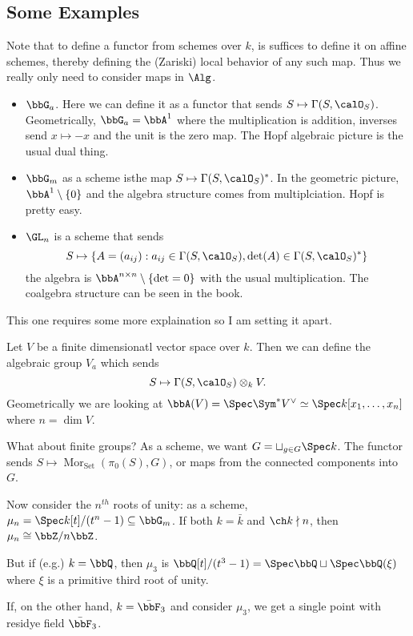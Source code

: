 \documentclass[12pt]{article}
\begin{document}
\subsection{Some Examples}
\begin{rmk}
	Note that to define a functor from schemes over $k$, is suffices to define it on affine schemes, thereby defining 
	the (Zariski) local behavior of any such map. Thus we really only need to consider maps in $\Alg$.
\end{rmk}
\begin{itemize}
	\item $\bbG_a$. Here we can define it as a functor that sends $S\mapsto\Gamma(S,\calO_S)$. Geometrically, $\bbG_a=\bbA^1$ where the multiplication is addition, inverses send $x\mapsto -x$ and the unit is the zero map.
	The Hopf algebraic picture is the usual dual thing.
	\item $\bbG_m$ as a scheme isthe map $S\mapsto \Gamma(S,\calO_S)^\ast$. In the geometric picture, $\bbA^1\setminus\{0\}$ and the algebra structure comes from multiplciation. Hopf is pretty easy.
	\item $\GL_n$ is a scheme that sends
	\[S\mapsto \left\{A=(a_{ij}): a_{ij}\in\Gamma(S,\calO_S), \det(A)\in\Gamma(S,\calO_S)^\ast\right\}\]
	the algebra is $\bbA^{n\times n}\setminus \{\det = 0\}$ with the usual multiplication. The coalgebra structure can be seen in the book.
\end{itemize}
This one requires some more explaination so I am setting it apart.
\begin{ex}
	Let $V$ be a finite dimensionatl vector space over $k$. Then we can define the algebraic group $V_a$ which sends 
	\[S\mapsto \Gamma(S,\calO_S)\otimes_k V.\]
	Geometrically we are looking at $\bbA(V)=\Spec\Sym ^\ast V^\vee\simeq \Spec k[x_1,\dots,x_n]$ where $n=\dim V$.
\end{ex}

What about finite groups? As a scheme, we want $G=\sqcup_{g\in G}\Spec k$. The functor sends $S\mapsto \operatorname{Mor}_{\operatorname{Set}}(\pi_0(S),G)$,
or maps from the connected components into $G$.

\begin{ex}
	Now consider the $n^{th}$ roots of unity: as a scheme, $\mu_n=\Spec k[t]/(t^n-1)\subseteq \bbG_m$.
	If both $k=\bar k$ and $\ch k\nmid n$, then $\mu_n\cong\bbZ/n\bbZ$.

	But if (e.g.) $k=\bbQ$, then $\mu_3$ is $\bbQ[t]/(t^3-1)=\Spec\bbQ\sqcup \Spec\bbQ(\xi)$ where $\xi$ is a primitive third root of unity.

	If, on the other hand, $k=\bar \bbF_3$ and consider $\mu_3$, we get a single point with residye field $\bar\bbF_3$.
\end{ex}
\end{document}
